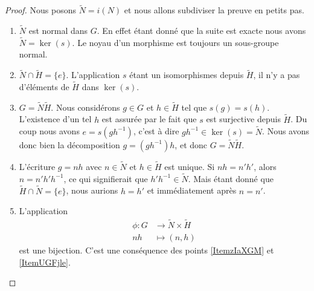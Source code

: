 \begin{proof}
    Nous posons \( \tilde N=i(N)\) et nous allons subdiviser la preuve en petits pas.

    \begin{enumerate}
        \item  \( \tilde N\) est normal dans \( G\). En effet étant donné que la suite est exacte nous avons \( \tilde N=\ker(s)\). Le noyau d'un morphisme est toujours un sous-groupe normal.

        \item \( \tilde N\cap\tilde H=\{ e \}\). L'application \( s\) étant un isomorphismes depuis $\tilde H$, il n'y a pas d'éléments de \( \tilde H\) dans \( \ker(s)\).
    
        \item\label{ItemzIaXGM} \( G=\tilde N\tilde H\). Nous considérons \( g\in G\) et \( h\in \tilde H\) tel que \( s(g)=s(h)\). L'existence d'un tel \( h\) est assurée par le fait que \( s\) est surjective depuis \( \tilde H\). Du coup nous avons \( e=s(gh^{-1})\), c'est à dire \( gh^{-1}\in \ker (s)=\tilde N\). Nous avons donc bien la décomposition \( g=(gh^{-1})h\), et donc \( G=\tilde N\tilde H\).

        \item\label{ItemUGFjle} L'écriture \( g=nh\) avec \( n\in \tilde N\) et \( h\in \tilde H\) est unique. Si \( nh=n'h'\), alors \( n=n'h'h^{-1}\), ce qui signifierait que \( h'h^{-1}\in\tilde N\). Mais étant donné que \( \tilde H\cap\tilde N=\{ e \}\), nous aurions \( h=h'\) et immédiatement après \( n=n'\).

        \item   \label{ItemUZlrKo}
            L'application
            \begin{equation}
                \begin{aligned}
                    \phi\colon G&\to \tilde N\times \tilde H \\
                    nh&\mapsto (n,h) 
                \end{aligned}
            \end{equation}
            est une bijection. C'est une conséquence des points \ref{ItemzIaXGM} et \ref{ItemUGFjle}.


\end{enumerate}
\end{proof}

